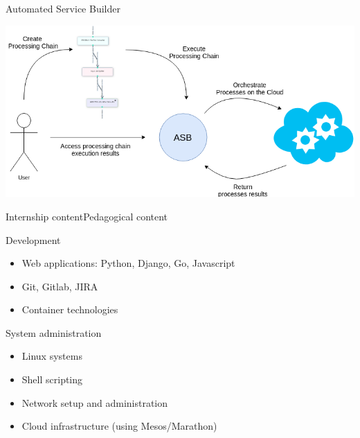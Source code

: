 \documentclass[10pt]{beamer}
\begin{document}
\begin{frame}{Automated Service Builder}{}
    \begin{block}{}
      \includegraphics[scale=0.4]{img/asb-user-processingchain}
    \end{block}
\end{frame}



\begin{frame}{Internship content}{Pedagogical content}
    \begin{block}{Development}
      \begin{itemize}
        \item Web applications: Python, Django, Go, Javascript
        \item Git, Gitlab, JIRA
        \item Container technologies
      \end{itemize}
    \end{block}
    \begin{block}{System administration}
      \begin{itemize}
        \item Linux systems
        \item Shell scripting
        \item Network setup and administration
        \item Cloud infrastructure (using Mesos/Marathon)
      \end{itemize}
    \end{block}
\end{frame}
\end{document}
